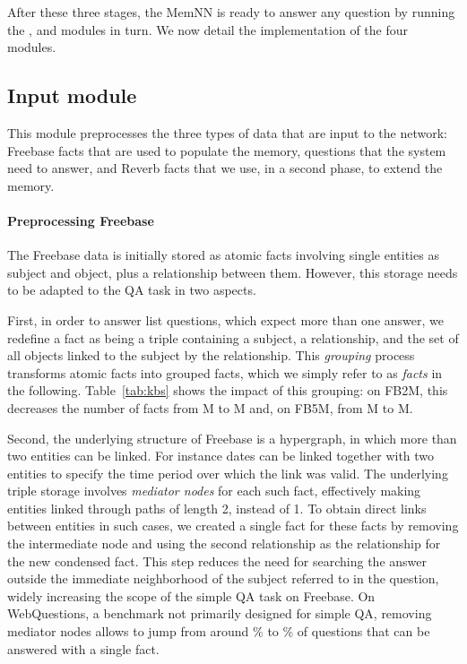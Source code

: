 \documentclass[11pt,a4paper]{article}
\newcommand{\fb}{{\sf Freebase}\xspace}
\newcommand{\wq}{{\sf WebQuestions}\xspace}
\newcommand{\rv}{{\sf Reverb}\xspace}
\newcommand{\fbs}{{\sf FB2M}\xspace}
\newcommand{\fbb}{{\sf FB5M}\xspace}
\begin{document}
After these three stages, the MemNN is ready to answer any question by
running the ,  and  modules in turn. 
We now detail the implementation of the four modules.

\subsection{Input module}
\label{sec:MemNNinput}
This module preprocesses the three types of data that are
input to the network: \fb facts that are used to populate the memory,
questions that the system need to answer, and \rv facts
that we use, in a second phase, to extend the memory.

\paragraph{Preprocessing Freebase}
The \fb data is initially stored as atomic facts involving single
entities as subject and object, plus a relationship between
them. However, this storage needs to be adapted to the QA task in two
aspects.

First, in order to answer list questions, which expect more than one
answer, we redefine a fact as being a triple containing a subject, a
relationship, and the set of all objects linked to the subject by the
relationship. This {\it grouping} process transforms atomic facts
into grouped facts, which we simply refer to as {\it facts} in the
following.
Table~\ref{tab:kbs} shows the impact of this grouping: on \fbs, this
decreases the number of facts from M to M and, on \fbb, from
M to M.



Second, the underlying structure of \fb is a hypergraph, in which
more than two entities can be linked. For instance dates can be linked
together with two entities to specify the time period over which the
link was valid. The underlying triple storage involves {\it mediator
  nodes} for each such fact, effectively making entities linked
through paths of length 2, instead of 1. To obtain direct
links between entities in such cases, we created a single fact for
these facts by removing the intermediate node and using the
second relationship as the relationship for the new condensed fact. This
step reduces the need for searching the answer outside the immediate
neighborhood of the subject referred to in the question, widely
increasing the scope of the simple QA task on \fb.
On \wq, a benchmark not primarily designed for simple
QA, removing mediator nodes allows to jump from around \% to
\% of questions that can be answered with a single fact.
\end{document}
